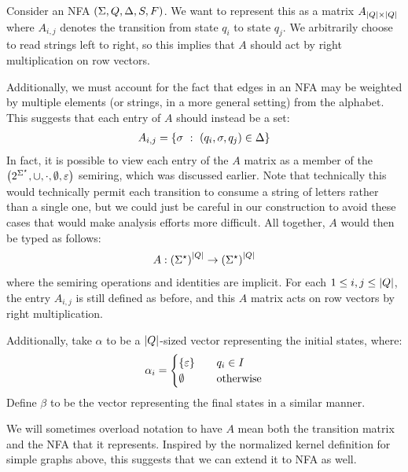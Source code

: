 \documentclass[12pt]{article}
\begin{document}
Consider an NFA \(\left(\Sigma, Q, \Delta, S, F\right)\).
We want to represent this as a matrix \(A_{\left\lvert Q\right\rvert \times \left\lvert Q\right\rvert}\)
where \(A_{i, j}\) denotes the transition from state \(q_i\)
to state \(q_j\).
We arbitrarily choose to read strings left to right, so this implies that
\(A\) should act by right multiplication on row vectors.

Additionally, we must account for the fact that edges in an NFA
may be weighted by multiple elements (or strings, in a more general setting)
from the alphabet.
This suggests that each entry of \(A\) should instead be a set:
\begin{align*}
  A_{i, j} =
    \left\{\sigma \  : \  \left(q_i, \sigma, q_j\right) \in \Delta\right\}
\end{align*}
In fact, it is possible to view each entry of the \(A\) matrix
as a member of the
\(\left(2^{\Sigma^\star}, \cup, \cdot, \emptyset, \varepsilon\right)\)
semiring, which was discussed earlier.
Note that technically this would technically permit each transition
to consume a string of letters rather than a single one,
but we could just be careful in our construction to avoid
these cases that would make analysis efforts more difficult.
All together, \(A\) would then be typed as follows:
\begin{align*}
  A : \left(\Sigma^\star\right)^{\left\lvert Q\right\rvert} \to \left(\Sigma^\star\right)^{\left\lvert Q\right\rvert}
\end{align*}
where the semiring operations and identities are implicit.
For each \(1 \leq i, j \leq \left\lvert Q\right\rvert\),
the entry \(A_{i, j}\) is still defined as before,
and this \(A\) matrix acts on row vectors by right multiplication.

Additionally, take \(\alpha\) to be a \(\left\lvert Q\right\rvert\)-sized vector
representing the initial states, where:
\begin{align*}
  \alpha_i =
    \begin{cases}
      \left\{\varepsilon\right\} &\quad q_i \in I \\
      \emptyset &\quad \text{otherwise}
    \end{cases}
\end{align*}
Define \(\beta\) to be the vector representing the final states
in a similar manner.

We will sometimes overload notation to have \(A\) mean both the transition
matrix and the NFA that it represents.
Inspired by the normalized kernel definition for simple graphs above,
this suggests that we can extend it to NFA as well.
\end{document}
